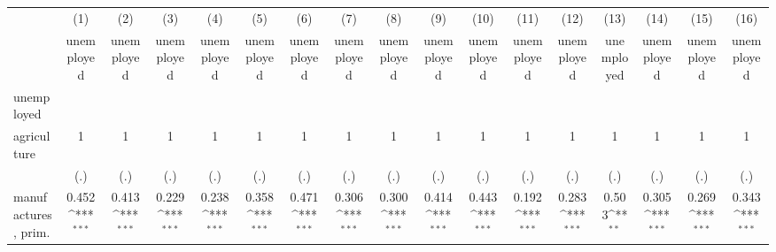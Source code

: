 {
\def\sym#1{\ifmmode^{#1}\else\(^{#1}\)\fi}
\begin{tabular}{l*{16}{c}}
\hline\hline
                    &\multicolumn{1}{c}{(1)}&\multicolumn{1}{c}{(2)}&\multicolumn{1}{c}{(3)}&\multicolumn{1}{c}{(4)}&\multicolumn{1}{c}{(5)}&\multicolumn{1}{c}{(6)}&\multicolumn{1}{c}{(7)}&\multicolumn{1}{c}{(8)}&\multicolumn{1}{c}{(9)}&\multicolumn{1}{c}{(10)}&\multicolumn{1}{c}{(11)}&\multicolumn{1}{c}{(12)}&\multicolumn{1}{c}{(13)}&\multicolumn{1}{c}{(14)}&\multicolumn{1}{c}{(15)}&\multicolumn{1}{c}{(16)}\\
                    &\multicolumn{1}{c}{unemployed}&\multicolumn{1}{c}{unemployed}&\multicolumn{1}{c}{unemployed}&\multicolumn{1}{c}{unemployed}&\multicolumn{1}{c}{unemployed}&\multicolumn{1}{c}{unemployed}&\multicolumn{1}{c}{unemployed}&\multicolumn{1}{c}{unemployed}&\multicolumn{1}{c}{unemployed}&\multicolumn{1}{c}{unemployed}&\multicolumn{1}{c}{unemployed}&\multicolumn{1}{c}{unemployed}&\multicolumn{1}{c}{unemployed}&\multicolumn{1}{c}{unemployed}&\multicolumn{1}{c}{unemployed}&\multicolumn{1}{c}{unemployed}\\
\hline
unemployed          &                     &                     &                     &                     &                     &                     &                     &                     &                     &                     &                     &                     &                     &                     &                     &                     \\
agriculture         &           1         &           1         &           1         &           1         &           1         &           1         &           1         &           1         &           1         &           1         &           1         &           1         &           1         &           1         &           1         &           1         \\
                    &         (.)         &         (.)         &         (.)         &         (.)         &         (.)         &         (.)         &         (.)         &         (.)         &         (.)         &         (.)         &         (.)         &         (.)         &         (.)         &         (.)         &         (.)         &         (.)         \\
[1em]
manufactures, prim. &       0.452\sym{***}&       0.413\sym{***}&       0.229\sym{***}&       0.238\sym{***}&       0.358\sym{***}&       0.471\sym{***}&       0.306\sym{***}&       0.300\sym{***}&       0.414\sym{***}&       0.443\sym{***}&       0.192\sym{***}&       0.283\sym{***}&       0.503\sym{**} &       0.305\sym{***}&       0.269\sym{***}&       0.343\sym{***}\\

\end{tabular}}
